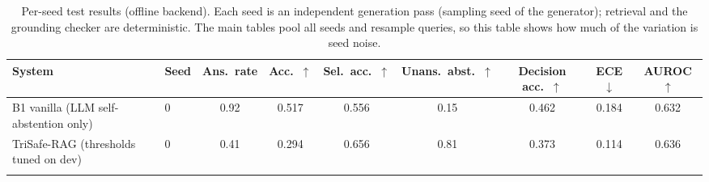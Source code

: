 \begin{table}[t]
  \caption{Per-seed test results (offline backend). Each seed is an independent generation pass (sampling seed of the generator); retrieval and the grounding checker are deterministic. The main tables pool all seeds and resample queries, so this table shows how much of the variation is seed noise.}
  \label{tab:seeds-offline}
  \footnotesize
  \setlength{\tabcolsep}{4pt}
  \begin{tabular}{llccccccc}
    \toprule
    System & Seed & Ans.\ rate & Acc.\ $\uparrow$ & Sel.\ acc.\ $\uparrow$ & Unans.\ abst.\ $\uparrow$ & Decision acc.\ $\uparrow$ & ECE $\downarrow$ & AUROC $\uparrow$ \\
    \midrule
    B1 vanilla (LLM self-abstention only) & 0 & 0.92 & 0.517 & 0.556 & 0.15 & 0.462 & 0.184 & 0.632 \\
    \addlinespace
    TriSafe-RAG (thresholds tuned on dev) & 0 & 0.41 & 0.294 & 0.656 & 0.81 & 0.373 & 0.114 & 0.636 \\
    \addlinespace
    \bottomrule
  \end{tabular}
\end{table}
